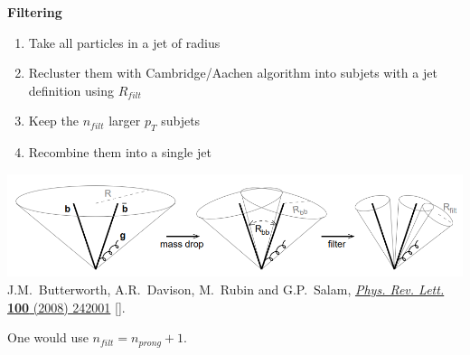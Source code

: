 \documentclass[9pt,a4paper,unknownkeysallowed,xcolor=dvipsnames,aspectratio=43]{beamer}
\begin{document}
%
%
\begin{frame}{\bf \huge Filtering}

\begin{enumerate}
    \item Take all particles in a jet of radius
    \vspace{2mm}
    \item Recluster them with Cambridge/Aachen algorithm into subjets with a jet definition using $R_{filt}$
    \vspace{2mm}
    \item Keep the $n_{filt}$ larger $p_T$ subjets
    \vspace{2mm}
    \item Recombine them into a single jet
\end{enumerate}
\vspace{2mm}
\begin{center}
\includegraphics[width=\textwidth]{05/filtering.PNG}\\\vspace{2mm}
    {\tiny \color{teablue} J.M.~Butterworth, A.R.~Davison, M.~Rubin and G.P.~Salam, %
  \href{https://doi.org/10.1103/PhysRevLett.100.242001}{\emph{Phys. Rev. Lett.}
  {\bfseries 100} (2008) 242001}
  [\href{https://arxiv.org/abs/0802.2470}{{}}].}
\end{center}
\vspace{2mm}
One would use $n_{filt}=n_{prong} + 1$.
\end{frame}
\end{document}
